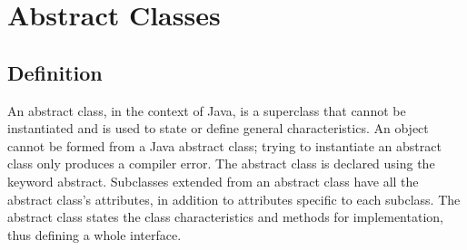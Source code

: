 \documentclass{article}
\begin{document}
\section{Abstract Classes}
\subsection{Definition}
An abstract class, in the context of Java, is a superclass that cannot be instantiated and is used to state or define general characteristics. An object cannot be formed from a Java abstract class; trying to instantiate an abstract class only produces a compiler error. The abstract class is declared using the keyword abstract.
Subclasses extended from an abstract class have all the abstract class's attributes, in addition to attributes specific to each subclass. The abstract class states the class characteristics and methods for implementation, thus defining a whole interface.
\end{document}
